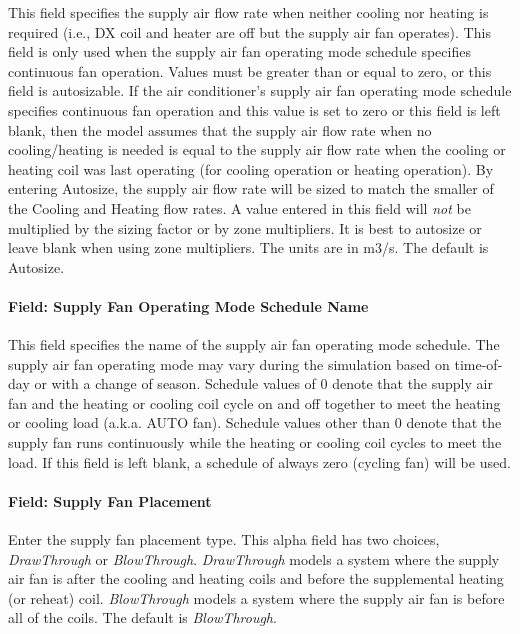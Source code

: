 This field specifies the supply air flow rate when neither cooling nor heating is required (i.e., DX coil and heater are off but the supply air fan operates). This field is only used when the supply air fan operating mode schedule specifies continuous fan operation. Values must be greater than or equal to zero, or this field is autosizable. If the air conditioner's supply air fan operating mode schedule specifies continuous fan operation and this value is set to zero or this field is left blank, then the model assumes that the supply air flow rate when no cooling/heating is needed is equal to the supply air flow rate when the cooling or heating coil was last operating (for cooling operation or heating operation). By entering Autosize, the supply air flow rate will be sized to match the smaller of the Cooling and Heating flow rates. A value entered in this field will \emph{not} be multiplied by the sizing factor or by zone multipliers. It is best to autosize or leave blank when using zone multipliers. The units are in m3/s. The default is Autosize.

\paragraph{Field: Supply Fan Operating Mode Schedule Name}\label{field-supply-fan-operating-mode-schedule-name-6}

This field specifies the name of the supply air fan operating mode schedule. The supply air fan operating mode may vary during the simulation based on time-of-day or with a change of season. Schedule values of 0 denote that the supply air fan and the heating or cooling coil cycle on and off together to meet the heating or cooling load (a.k.a. AUTO fan). Schedule values other than 0 denote that the supply fan runs continuously while the heating or cooling coil cycles to meet the load. If this field is left blank, a schedule of always zero (cycling fan) will be used.

\paragraph{Field: Supply Fan Placement}\label{field-supply-fan-placement-6}

Enter the supply fan placement type. This alpha field has two choices, \emph{DrawThrough} or \emph{BlowThrough}. \emph{DrawThrough} models a system where the supply air fan is after the cooling and heating coils and before the supplemental heating (or reheat) coil. \emph{BlowThrough} models a system where the supply air fan is before all of the coils. The default is \emph{BlowThrough}.


